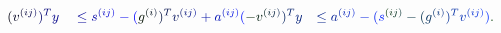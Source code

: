 \documentclass[12pt]{article}
\begin{document}
\makeatletter
\renewcommand*{\@textcolor}[3]{%
  \protect\leavevmode
  \begingroup
    \color#1{#2}#3%
  \endgroup
}
\makeatother
\begin{displaymath}
\begin{array} {rlr} \displaystyle { \mathcolor[RGB]{0,0,15}{(} \mathcolor[RGB]{0,0,30}{v} ^ { \mathcolor[RGB]{0,0,45}{(} \mathcolor[RGB]{0,0,60}{i} \mathcolor[RGB]{0,0,75}{j} \mathcolor[RGB]{0,0,90}{)} } \mathcolor[RGB]{0,0,105}{)} ^ { \mathcolor[RGB]{0,0,120}{T} } \mathcolor[RGB]{0,0,135}{y} } & \displaystyle { { } \mathcolor[RGB]{0,0,150}{\leq} \mathcolor[RGB]{0,0,165}{s} ^ { \mathcolor[RGB]{0,0,180}{(} \mathcolor[RGB]{0,0,195}{i} \mathcolor[RGB]{0,0,210}{j} \mathcolor[RGB]{0,0,225}{)} } \mathcolor[RGB]{0,0,240}{-} \mathcolor[RGB]{0,0,255}{(} \mathcolor[RGB]{0,15,0}{g} ^ { \mathcolor[RGB]{0,15,15}{(} \mathcolor[RGB]{0,15,30}{i} \mathcolor[RGB]{0,15,45}{)} } \mathcolor[RGB]{0,15,60}{)} ^ { \mathcolor[RGB]{0,15,75}{T} } \mathcolor[RGB]{0,15,90}{v} ^ { \mathcolor[RGB]{0,15,105}{(} \mathcolor[RGB]{0,15,120}{i} \mathcolor[RGB]{0,15,135}{j} \mathcolor[RGB]{0,15,150}{)} } \mathcolor[RGB]{0,15,165}{+} \mathcolor[RGB]{0,15,180}{a} ^ { \mathcolor[RGB]{0,15,195}{(} \mathcolor[RGB]{0,15,210}{i} \mathcolor[RGB]{0,15,225}{j} \mathcolor[RGB]{0,15,240}{)} } \mathcolor[RGB]{0,15,255}{(} \mathcolor[RGB]{0,30,0}{-} \mathcolor[RGB]{0,30,15}{v} ^ { \mathcolor[RGB]{0,30,30}{(} \mathcolor[RGB]{0,30,45}{i} \mathcolor[RGB]{0,30,60}{j} \mathcolor[RGB]{0,30,75}{)} } \mathcolor[RGB]{0,30,90}{)} ^ { \mathcolor[RGB]{0,30,105}{T} } \mathcolor[RGB]{0,30,120}{y} } & \displaystyle { \mathcolor[RGB]{0,30,135}{\leq} \mathcolor[RGB]{0,30,150}{a} ^ { \mathcolor[RGB]{0,30,165}{(} \mathcolor[RGB]{0,30,180}{i} \mathcolor[RGB]{0,30,195}{j} \mathcolor[RGB]{0,30,210}{)} } \mathcolor[RGB]{0,30,225}{-} \mathcolor[RGB]{0,30,240}{(} \mathcolor[RGB]{0,30,255}{s} ^ { \mathcolor[RGB]{0,45,0}{(} \mathcolor[RGB]{0,45,15}{i} \mathcolor[RGB]{0,45,30}{j} \mathcolor[RGB]{0,45,45}{)} } \mathcolor[RGB]{0,45,60}{-} \mathcolor[RGB]{0,45,75}{(} \mathcolor[RGB]{0,45,90}{g} ^ { \mathcolor[RGB]{0,45,105}{(} \mathcolor[RGB]{0,45,120}{i} \mathcolor[RGB]{0,45,135}{)} } \mathcolor[RGB]{0,45,150}{)} ^ { \mathcolor[RGB]{0,45,165}{T} } \mathcolor[RGB]{0,45,180}{v} ^ { \mathcolor[RGB]{0,45,195}{(} \mathcolor[RGB]{0,45,210}{i} \mathcolor[RGB]{0,45,225}{j} \mathcolor[RGB]{0,45,240}{)} } \mathcolor[RGB]{0,45,255}{)} \mathcolor[RGB]{0,60,0}{.} } \end{array}
\end{displaymath}
\end{document}
